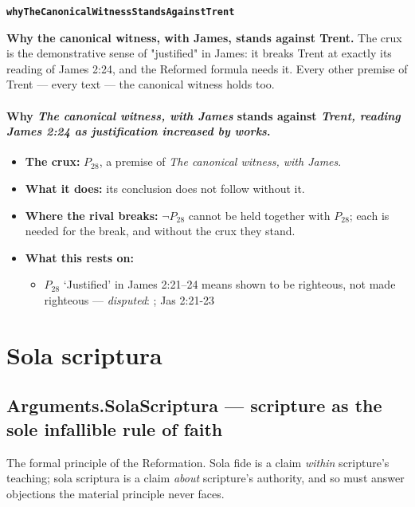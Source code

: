 \documentclass[11pt]{article}
\begin{document}
\par\medskip\noindent\textbf{\texttt{why\allowbreak{}The\allowbreak{}Canonical\allowbreak{}Witness\allowbreak{}Stands\allowbreak{}Against\allowbreak{}Trent}}\par\nobreak\noindent
\textbf{Why the canonical witness, with James, stands against Trent.} The crux is the demonstrative sense of "justified" in James: it breaks Trent at exactly its reading of James 2:24, and the Reformed formula needs it. Every other premise of Trent — every text — the canonical witness holds too.

\paragraph{Why \emph{The canonical witness, with James} stands against \emph{Trent, reading James 2:24 as justification increased by works}.}
\begin{itemize}
\item \textbf{The crux:} \(P_{28}\), a premise of \emph{The canonical witness, with James}.
\item \textbf{What it does:} its conclusion does not follow without it.
\item \textbf{Where the rival breaks:} \(\lnot P_{28}\) cannot be held together with \(P_{28}\); each is needed for the break, and without the crux they stand.
\item \textbf{What this rests on:}
\begin{itemize}
\item \(P_{28}\) ‘Justified’ in James 2:21–24 means shown to be righteous, not made righteous --- \emph{disputed}: \cite[III.xvii.11]{calvin-institutes-1960}; Jas 2:21-23
\end{itemize}
\end{itemize}
\clearpage
\section*{Sola scriptura}

\subsection*{Arguments.SolaScriptura — scripture as the sole infallible rule of faith}
The formal principle of the Reformation. Sola fide is a claim \emph{within} scripture's teaching; sola scriptura is a claim \emph{about} scripture's authority, and so must answer objections the material principle never faces.
\end{document}
